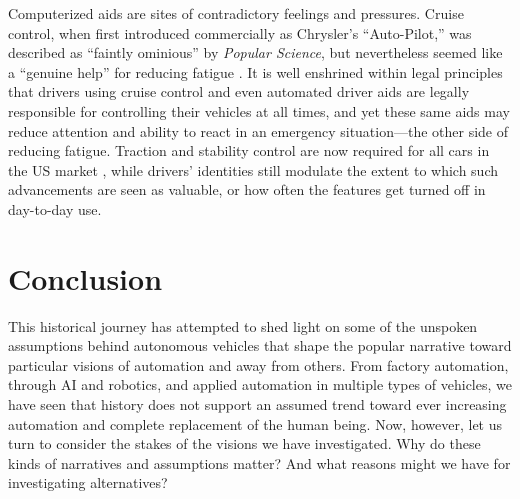 
Computerized aids are sites of contradictory feelings and pressures.
Cruise control, when first introduced commercially as Chrysler's ``Auto-Pilot,''
was described as ``faintly
ominious'' by \emph{Popular Science}, but nevertheless seemed like a
``genuine help'' for reducing
fatigue \cite{rowsomePopsci}.
It is well enshrined within legal principles that drivers using
cruise control and even automated driver aids are legally responsible
for controlling their vehicles at all times, and yet these same aids
may reduce attention and ability to react in an emergency
situation---the other side of reducing fatigue.
Traction and stability control are now required for all cars in the US
market \cite{brookingsLiability}, while drivers' identities still modulate the
extent to which such
advancements are seen as valuable, or how often the features get
turned off in day-to-day use. 

\section{Conclusion}

This historical journey has attempted
to shed light on some of the unspoken assumptions behind autonomous
vehicles that shape the popular narrative toward
particular visions of automation and away from others. From factory
automation, through AI and robotics, and applied automation in
multiple types of vehicles, we have seen that history does not support
an assumed trend toward ever increasing automation and complete
replacement of the human being. Now, however,
let us turn to consider the stakes of the 
visions we have investigated. Why do these kinds of narratives and
assumptions matter? And what 
reasons might we have for investigating alternatives?



